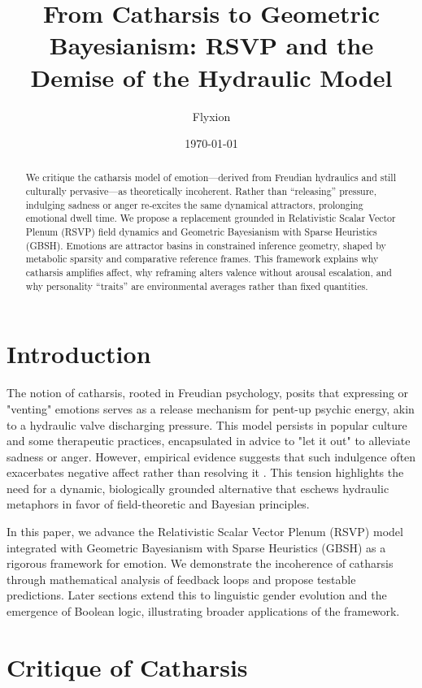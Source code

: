 \documentclass[11pt]{article}
\title{From Catharsis to Geometric Bayesianism: RSVP and the Demise of the Hydraulic Model}
\author{Flyxion}
\date{\today}
\theoremstyle{plain}
\begin{document}
\maketitle

\begin{abstract}
We critique the catharsis model of emotion—derived from Freudian hydraulics and still culturally pervasive—as theoretically incoherent. Rather than “releasing” pressure, indulging sadness or anger re-excites the same dynamical attractors, prolonging emotional dwell time. We propose a replacement grounded in Relativistic Scalar Vector Plenum (RSVP) field dynamics and Geometric Bayesianism with Sparse Heuristics (GBSH). Emotions are attractor basins in constrained inference geometry, shaped by metabolic sparsity and comparative reference frames. This framework explains why catharsis amplifies affect, why reframing alters valence without arousal escalation, and why personality “traits” are environmental averages rather than fixed quantities.
\end{abstract}

\section{Introduction}

The notion of catharsis, rooted in Freudian psychology, posits that expressing or "venting" emotions serves as a release mechanism for pent-up psychic energy, akin to a hydraulic valve discharging pressure. This model persists in popular culture and some therapeutic practices, encapsulated in advice to "let it out" to alleviate sadness or anger. However, empirical evidence suggests that such indulgence often exacerbates negative affect rather than resolving it \citep{Douglas1966}. This tension highlights the need for a dynamic, biologically grounded alternative that eschews hydraulic metaphors in favor of field-theoretic and Bayesian principles.

In this paper, we advance the Relativistic Scalar Vector Plenum (RSVP) model integrated with Geometric Bayesianism with Sparse Heuristics (GBSH) as a rigorous framework for emotion. We demonstrate the incoherence of catharsis through mathematical analysis of feedback loops and propose testable predictions. Later sections extend this to linguistic gender evolution and the emergence of Boolean logic, illustrating broader applications of the framework.

\section{Critique of Catharsis}
\end{document}
